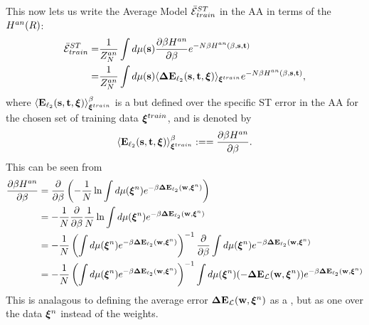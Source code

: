 %
This now lets us write the Average Model \TrainingError $\bar{\mathcal{E}}^{ST}_{train}$ in the AA in terms of the \AnnealedHamiltonian $H^{an}(R)$:
  \begin{align}
  \nonumber
  \bar{\mathcal{E}}^{ST}_{train}
   =& \dfrac{1}{Z^{an}_{N}}\int d\mu({\mathbf{s}})\dfrac{\partial \beta H^{an}}{\partial \beta} e^{-N\beta H^{an}(\beta,{\mathbf{s}},{\mathbf{t}})} \\ 
  \label{eqn:EtM2}
   =& \dfrac{1}{Z^{an}_{N}}\int d\mu({\mathbf{s}})\langle  \mathbf{\Delta E}_{\ell_2}({\mathbf{s}},{\mathbf{t}},\boldsymbol{\xi}) \rangle_{\boldsymbol{\xi}^{train}} e^{-N\beta H^{an}(\beta,{\mathbf{s}},{\mathbf{t}})}  ,
  \end{align}
  where $\langle \mathbf{E}_{\ell_2}({\mathbf{s}},{\mathbf{t}},\boldsymbol{\xi}) \rangle^{\beta}_{\boldsymbol{\xi}^{train}}$
  is a \ThermalAverage but defined over the specific ST error in the AA for the chosen set of training data $\boldsymbol{\xi}^{train}$, and is denoted by 
 \begin{align}
   \langle  \mathbf{E}_{\ell_2}({\mathbf{s}},{\mathbf{t}},\boldsymbol{\xi}) \rangle^{\beta}_{\boldsymbol{\xi}^{train}}:==\dfrac{\partial \beta H^{an}}{\partial \beta}.
 \end{align}
 This can be seen from
 \begin{align}
  \label{eqn:partial_Gan}
  \dfrac{\partial \beta H^{an}}{\partial \beta}
  &=  \dfrac{\partial }{\partial \beta} \left(-\frac{1}{N}\ln \int d\mu(\boldsymbol{\xi}^{n})e^{-\beta\mathbf{\Delta {E}}_{\ell_2}(\mathbf{w}, \boldsymbol{\xi}^{n})}\right) \\ \nonumber
  &=  -\frac{1}{N}\dfrac{\partial }{\partial \beta} \frac{1}{N}\ln \int d\mu(\boldsymbol{\xi}^{n})e^{-\beta\mathbf{\Delta {E}}_{\ell_2}(\mathbf{w}, \boldsymbol{\xi}^{n})} \\ \nonumber
  &=  -\frac{1}{N} \left( \int d\mu(\boldsymbol{\xi}^{n})e^{-\beta\mathbf{\Delta {E}}_{\ell_2}(\mathbf{w}, \boldsymbol{\xi}^{n})}\right)^{-1}\dfrac{\partial }{\partial \beta} \int d\mu(\boldsymbol{\xi}^{n})e^{-\beta\mathbf{\Delta {E}}_{\ell_2}(\mathbf{w}, \boldsymbol{\xi}^{n})} \\ \nonumber
    &=  -\frac{1}{N} \left(\int d\mu(\boldsymbol{\xi}^{n})e^{-\beta\mathbf{\Delta {E}}_{\ell_2}(\mathbf{w}, \boldsymbol{\xi}^{n})}\right)^{-1} \int d\mu(\boldsymbol{\xi}^{n})(-\mathbf{\Delta {E}}_{\mathcal{L}}(\mathbf{w}, \boldsymbol{\xi}^{n}))e^{-\beta\mathbf{\Delta {E}}_{\ell_2}(\mathbf{w}, \boldsymbol{\xi}^{n})}
 \end{align}
This is analagous to defining the average error $\mathbf{\Delta {E}}_{\mathcal{L}}(\mathbf{w}, \boldsymbol{\xi}^{n})$ as a \ThermalAverage, but as one over the data $\boldsymbol{\xi}^{n}$ instead of the weights.

